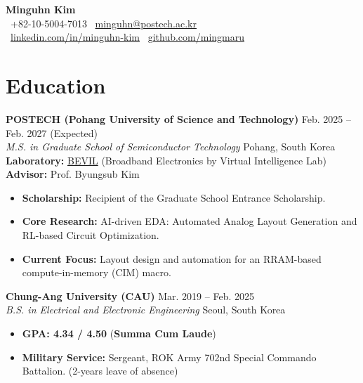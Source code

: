 \documentclass[11pt,a4paper,sans]{article}
\begin{document}
\begin{center}
    {\LARGE \textbf{\color{themeblue} Minguhn Kim}} \\ \vspace{5pt}
    \small
    \color{graytext}
    \faPhone* \ +82-10-5004-7013 \quad 
    \faEnvelope \ \href{mailto:minguhn@postech.ac.kr}{minguhn@postech.ac.kr} \\ \vspace{3pt}
    \faLinkedin \ \href{https://www.linkedin.com/in/minguhn-kim-8a8775288/?locale=ko}{linkedin.com/in/minguhn-kim} \quad 
    \faGithub \ \href{https://github.com/mingmaru}{github.com/mingmaru}
\end{center}

\section{Education}
\noindent\textbf{POSTECH (Pohang University of Science and Technology)} \hfill Feb. 2025 -- Feb. 2027 (Expected) \\
\textit{M.S. in Graduate School of Semiconductor Technology} \hfill Pohang, South Korea \\
\textbf{Laboratory:} \href{https://bevillab.postech.ac.kr/index.php}{BEVIL} (Broadband Electronics by Virtual Intelligence Lab) \\
\textbf{Advisor:} Prof. Byungsub Kim
\begin{itemize}[leftmargin=*, noitemsep, topsep=2pt]
    \item \textbf{Scholarship:} Recipient of the Graduate School Entrance Scholarship.
    \item \textbf{Core Research:} AI-driven EDA: Automated Analog Layout Generation and RL-based Circuit Optimization.
    \item \textbf{Current Focus:} Layout design and automation for an RRAM-based compute-in-memory (CIM) macro.
\end{itemize}

\vspace{5pt}

\noindent\textbf{Chung-Ang University (CAU)} \hfill Mar. 2019 -- Feb. 2025 \\
\textit{B.S. in Electrical and Electronic Engineering} \hfill Seoul, South Korea
\begin{itemize}[leftmargin=*, noitemsep, topsep=2pt]
    \item \textbf{GPA: 4.34 / 4.50} (\textbf{Summa Cum Laude})
    \item \textbf{Military Service:} Sergeant, ROK Army 702nd Special Commando Battalion. (2-years leave of absence)
\end{itemize}
\end{document}
